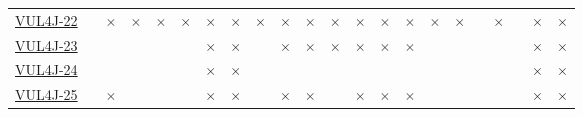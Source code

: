 \begin{table}[!htbp]
{\begin{tabular}{|l|lll|ll|ll||lll|ll|ll||lll|ll|ll|}
		\href{https://github.com/apache/shiro/commit/b15ab927709ca18ea4a02538be01919a19ab65af}{VUL4J-22} & \cellcolor{green}\checkmark & \cellcolor{red}$\times$ & \cellcolor{red}$\times$ & \cellcolor{red}$\times$ & \cellcolor{red}$\times$ & \cellcolor{red}$\times$ & \cellcolor{red}$\times$  & \cellcolor{red}$\times$ & \cellcolor{red}$\times$ & \cellcolor{red}$\times$ & \cellcolor{red}$\times$ & \cellcolor{red}$\times$ & \cellcolor{red}$\times$ & \cellcolor{red}$\times$     & \cellcolor{red}$\times$ & \cellcolor{red}$\times$ & \cellcolor{green}\checkmark & \cellcolor{red}$\times$ & \cellcolor{green}\checkmark & \cellcolor{red}$\times$ & \cellcolor{red}$\times$\\ 
		\href{https://github.com/apache/sling/commit/7d2365a248943071a44d8495655186e4f14ea294}{VUL4J-23} & \cellcolor{green}\checkmark & \cellcolor{yellow}\halfcheckmark & \cellcolor{green}\checkmark &
		\cellcolor{yellow}\halfcheckmark & \cellcolor{green}\checkmark & \cellcolor{red}$\times$ & \cellcolor{red}$\times$  & \cellcolor{green}\checkmark & \cellcolor{red}$\times$ & \cellcolor{red}$\times$ & \cellcolor{red}$\times$ & \cellcolor{red}$\times$ & \cellcolor{red}$\times$ & \cellcolor{red}$\times$     & \cellcolor{green}\checkmark & 
		\cellcolor{yellow}\halfcheckmark & \cellcolor{green}\checkmark & 
		\cellcolor{yellow}\halfcheckmark & \cellcolor{green}\checkmark & \cellcolor{red}$\times$ & \cellcolor{red}$\times$\\ 
		\href{https://github.com/apache/sling/commit/fb2719e8299fadddae62245482de112052a0e08c}{VUL4J-24} & \cellcolor{green}\checkmark & \cellcolor{yellow}\halfcheckmark & \cellcolor{green}\checkmark &
		\cellcolor{yellow}\halfcheckmark & \cellcolor{green}\checkmark & \cellcolor{red}$\times$ & \cellcolor{red}$\times$  & \cellcolor{green}\checkmark & \cellcolor{green}\checkmark & \cellcolor{green}\checkmark & \cellcolor{green}\checkmark & \cellcolor{green}\checkmark & \cellcolor{green}\checkmark & \cellcolor{green}\checkmark     & \cellcolor{green}\checkmark & 
		\cellcolor{yellow}\halfcheckmark & \cellcolor{green}\checkmark &
		\cellcolor{yellow}\halfcheckmark & \cellcolor{green}\checkmark & \cellcolor{red}$\times$ & \cellcolor{red}$\times$\\ 
		\href{https://github.com/apache/sling-org-apache-sling-xss/commit/ec6764d165abc4df8cffd8439761bb2228887db9}{VUL4J-25} & \cellcolor{green}\checkmark & \cellcolor{red}$\times$ & \cellcolor{green}\checkmark & \cellcolor{green}\checkmark & \cellcolor{green}\checkmark & \cellcolor{red}$\times$ & \cellcolor{red}$\times$  & \cellcolor{green}\checkmark & \cellcolor{red}$\times$ & \cellcolor{red}$\times$ & \cellcolor{yellow}\halfcheckmark & \cellcolor{red}$\times$ & \cellcolor{red}$\times$ & \cellcolor{red}$\times$     & \cellcolor{green}\checkmark & \cellcolor{yellow}\halfcheckmark & \cellcolor{green}\checkmark & \cellcolor{yellow}\halfcheckmark & \cellcolor{green}\checkmark & \cellcolor{red}$\times$ & \cellcolor{red}$\times$\\ 

\end{tabular}}
\end{table}
